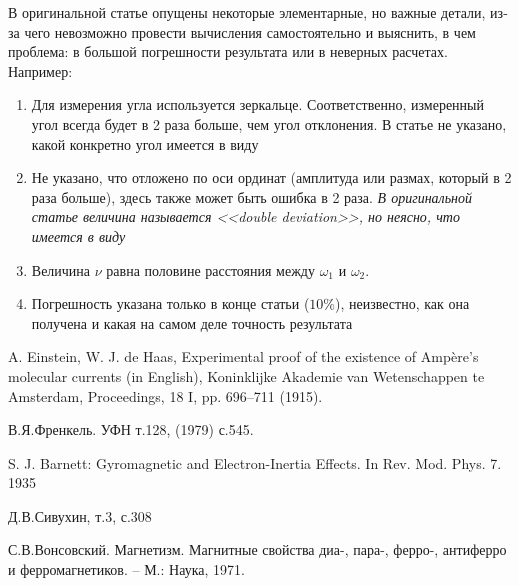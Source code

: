\documentclass[a4paper]{article}
\begin{document}
В оригинальной статье опущены некоторые элементарные, но важные детали, из-за чего невозможно провести вычисления самостоятельно и выяснить, в чем проблема: в большой погрешности результата или в неверных расчетах. Например:
\begin{enumerate}
	\item Для измерения угла используется зеркальце. Соответственно, измеренный угол всегда будет в 2 раза больше, чем угол отклонения. В статье не указано, какой конкретно угол имеется в виду
	\item Не указано, что отложено по оси ординат (амплитуда или размах, который в 2 раза больше), здесь также может быть ошибка в 2 раза. {\em В оригинальной статье величина называется <<double deviation>>, но неясно, что имеется в виду}
	\item Величина $\nu$ равна половине расстояния между $\omega_1$ и $\omega_2$.
	\item Погрешность указана только в конце статьи ($10 \%$), неизвестно, как она получена и какая на самом деле точность результата
\end{enumerate}
\begin{thebibliography}{}
\item A. Einstein, W. J. de Haas, Experimental proof of the existence of Ampère's molecular currents (in English), Koninklijke Akademie van Wetenschappen te Amsterdam, Proceedings, 18 I, pp. 696–711 (1915).
\item В.Я.Френкель. УФН т.128, (1979) с.545.
\item S. J. Barnett: Gyromagnetic and Electron-Inertia Effects. In Rev. Mod. Phys. 7. 1935
\item Д.В.Сивухин, т.3, с.308
\item\label{vons} С.В.Вонсовский. Магнетизм. Магнитные свойства диа-, пара-, ферро-, антиферро и ферромагнетиков. – М.: Наука, 1971.
\end{thebibliography}
\end{document}
